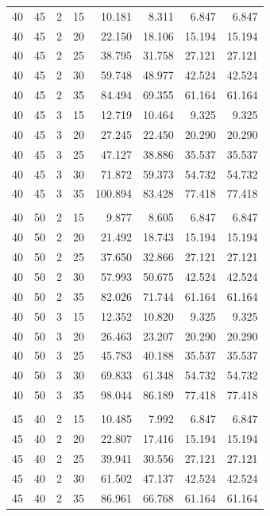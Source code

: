 \documentclass{article}
\begin{document}
\begin{longtable}{rrrrrrrr}
40 & 45 & 2 & 15 & 10.181 & 8.311 & 6.847 & 6.847 \\
40 & 45 & 2 & 20 & 22.150 & 18.106 & 15.194 & 15.194 \\
40 & 45 & 2 & 25 & 38.795 & 31.758 & 27.121 & 27.121 \\
40 & 45 & 2 & 30 & 59.748 & 48.977 & 42.524 & 42.524 \\
40 & 45 & 2 & 35 & 84.494 & 69.355 & 61.164 & 61.164 \\
40 & 45 & 3 & 15 & 12.719 & 10.464 & 9.325 & 9.325 \\
40 & 45 & 3 & 20 & 27.245 & 22.450 & 20.290 & 20.290 \\
40 & 45 & 3 & 25 & 47.127 & 38.886 & 35.537 & 35.537 \\
40 & 45 & 3 & 30 & 71.872 & 59.373 & 54.732 & 54.732 \\
40 & 45 & 3 & 35 & 100.894 & 83.428 & 77.418 & 77.418 \\
\addlinespace
\multicolumn{8}{l}{\textbf{$\theta_1=40^\circ$, $\theta_2=50^\circ$}} \\
40 & 50 & 2 & 15 & 9.877 & 8.605 & 6.847 & 6.847 \\
40 & 50 & 2 & 20 & 21.492 & 18.743 & 15.194 & 15.194 \\
40 & 50 & 2 & 25 & 37.650 & 32.866 & 27.121 & 27.121 \\
40 & 50 & 2 & 30 & 57.993 & 50.675 & 42.524 & 42.524 \\
40 & 50 & 2 & 35 & 82.026 & 71.744 & 61.164 & 61.164 \\
40 & 50 & 3 & 15 & 12.352 & 10.820 & 9.325 & 9.325 \\
40 & 50 & 3 & 20 & 26.463 & 23.207 & 20.290 & 20.290 \\
40 & 50 & 3 & 25 & 45.783 & 40.188 & 35.537 & 35.537 \\
40 & 50 & 3 & 30 & 69.833 & 61.348 & 54.732 & 54.732 \\
40 & 50 & 3 & 35 & 98.044 & 86.189 & 77.418 & 77.418 \\
\addlinespace
\multicolumn{8}{l}{\textbf{$\theta_1=45^\circ$, $\theta_2=40^\circ$}} \\
45 & 40 & 2 & 15 & 10.485 & 7.992 & 6.847 & 6.847 \\
45 & 40 & 2 & 20 & 22.807 & 17.416 & 15.194 & 15.194 \\
45 & 40 & 2 & 25 & 39.941 & 30.556 & 27.121 & 27.121 \\
45 & 40 & 2 & 30 & 61.502 & 47.137 & 42.524 & 42.524 \\
45 & 40 & 2 & 35 & 86.961 & 66.768 & 61.164 & 61.164 \\

\end{longtable}
\end{document}
